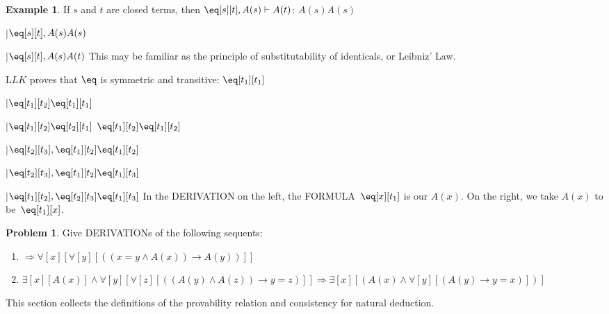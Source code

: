 \documentclass[10pt,a4paper]{article}
\newcommand*{\olup}[1]{\MakeUppercase{#1}}
\theoremstyle{plain}
\theoremstyle{definition}
\newtheorem{ex}[thm]{Example}
\newtheorem{prob}{Problem}[section]
\theoremstyle{remark}
\newenvironment{editorial}{}{}
\providecommand{\RightLabel}[1]{}
\providecommand{\DisplayProof}{}
\providecommand{\fCenter}{}
\newenvironment{prooftree}{}{}
\providecommand{\lif}{\mathbin{\rightarrow}}
\providecommand{\lforall}{\mathord{\forall}}
\providecommand{\lexists}{\mathord{\exists}}
\providecommand{\Sequent}{\mathrel{\Rightarrow}}
\providecommand{\Proves}{\mathrel{\vdash}}
\providecommand{\Log}{\ensuremath{\mathrm{L}}}
\providecommand{\LeftR}[1]{}
\providecommand{\UnaryInf}{\ensuremath{\mid}}
\providecommand{\Weakening}{\mathrm{Wk}}
\providecommand{\LeftR}{\mathrm{L}}
\providecommand{\Axiom}{\mathrm{Ax}}
\providecommand{\bottomAlignProof}{\relax}
\begin{document}
\begin{ex}
If $s$ and $t$ are closed terms, then $\eq[s][t], A(s)
\Proves A(t)$:
\begin{prooftree}
\Axiom$ A(s) \fCenter A(s)$
\RightLabel{\LeftR{\Weakening}}
\UnaryInf$\eq[s][t], A(s)  \fCenter A(s)$
\RightLabel{$\eq$}
\UnaryInf$\eq[s][t], A(s)  \fCenter A(t)$
\end{prooftree}
This may be familiar as the principle of substitutability of
identicals, or Leibniz' Law.

$\Log{LK}$ proves that $\eq$ is symmetric and transitive:
\begin{prooftree}
\Axiom$ \fCenter \eq[t_1][t_1] $
\RightLabel{\LeftR{\Weakening}}
\UnaryInf$ \eq[t_1][t_2] \fCenter \eq[t_1][t_1] $
\RightLabel{$\eq$}
\UnaryInf$ \eq[t_1][t_2] \fCenter \eq[t_2][t_1]$
\DisplayProof\qquad\bottomAlignProof
\Axiom$ \eq[t_1][t_2] \fCenter \eq[t_1][t_2] $
\RightLabel{\LeftR{\Weakening}}
\UnaryInf$\eq[t_2][t_3], \eq[t_1][t_2]  \fCenter \eq[t_1][t_2] $
\RightLabel{$\eq$}
\UnaryInf$\eq[t_2][t_3], \eq[t_1][t_2]  \fCenter \eq[t_1][t_3]$
\RightLabel{\LeftR{\Exchange}}
\UnaryInf$\eq[t_1][t_2], \eq[t_2][t_3]  \fCenter \eq[t_1][t_3]$
\end{prooftree}
In the \olup{derivation} on the left, the \olup{formula}~$\eq[x][t_1]$ is our
$A(x)$. On the right, we take $A(x)$ to be~$\eq[t_1][x]$.
\end{ex}

\begin{prob}
Give \olup{derivation}s of the following sequents:
\begin{enumerate}
\item $\Sequent \lforall[x][\lforall[y][((x = y \land A(x)) \lif A(y))]]$
\item $\lexists[x][A(x)] \land \lforall[y][\lforall[z][((A(y) \land
    A(z)) \lif y = z)]] \Sequent 
\lexists[x][(A(x) \land \lforall[y][(A(y) \lif y = x)])]$
\end{enumerate}
\end{prob}





\begin{editorial}
  This section collects the definitions of the provability relation and
  consistency for natural deduction.
\end{editorial}
\end{document}
